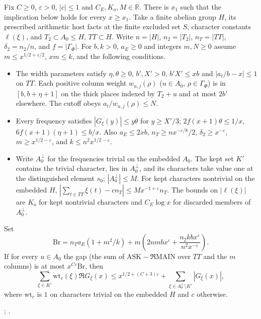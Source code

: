 
\begin{proposition}\label{sub:B09}
Fix $C\ge0$, $\varepsilon>0$, $|c|\le1$ and $C_E,K_o,M\in\mathbb R$.
There is $x_1$ such that the implication below holds for every $x\ge x_1$.
Take a finite abelian group $H$, its prescribed arithmetic host facts
at the finite excluded set $S$, character constants $\ell(\xi)$, and
$T_2\subset A_0\le H$, $TT\subset H$. Write $n=|H|$, $n_2=|T_2|$,
$n_T=|TT|$, $\delta_2=n_2/n$, and $f=|\Gamma_\Phi|$.
For $b,k>0$, $a_E\ge0$ and integers $m,N\ge0$ assume
$m\le x^{1/2+\varepsilon/2}$, $xm\le k$, and the following conditions.
\begin{itemize}
\item The width parameters satisfy $\eta,\theta\ge0$, $b',X'>0$,
$b'X'\le xb$ and $|a_t/b-x|\le1$ on $TT$.
Each positive column weight $w_{u,j}(\rho)$ ($u\in A_0$,
$\rho\in\Gamma_\Phi$) is in $[b,b+\eta+1]$ on the thick places
indexed by $T_2+u$ and at most $2b'$ elsewhere. The cutoff obeys
$a_t/w_{u,j}(\rho)\le N$.
\item Every frequency satisfies $|G_\xi(y)|\le y\theta$ for $y\ge X'/3$;
$2f(x+1)\theta\le1/x$, $6f(x+1)(\eta+1)\le b/x$.
Also $a_E\le2xb$, $n_T\ge nx^{-\varepsilon/8}/2$,
$\delta_2\ge x^{-\varepsilon}$, $m\ge x^{1/2-\varepsilon}$,
and $k\le n^2x^{1/2-\varepsilon}$.
\item Write $A_0^\perp$ for the frequencies trivial on the embedded $A_0$.
The kept set $K'$ contains the trivial character, lies in $A_0^\perp$,
and its characters take value one at the distinguished element $s_0$;
$|A_0^\perp|\le M$. For kept characters nontrivial on the embedded $H$,
$|\sum_{t\in TT}\xi(t)-cn_T|\le M x^{-1+\varepsilon}n_T$.
The bounds on $|\ell(\xi)|$ are $K_o$ for kept nontrivial characters
and $C_E\log x$ for discarded members of $A_0^\perp$.
\end{itemize}
Set
\[
 \mathrm{Br}=n_Ta_E(1+m^2/k)+
 m\left(2nmbx^\varepsilon+
          \frac{n_2kbx^\varepsilon}{n^2x^{-\varepsilon}}\right).
\]
If for every $u\in A_0$ the gap (the sum of $\mathrm{ASK}-\Re\mathrm{MAIN}$
over $TT$ and the $m$ columns) is at most $x^{C\varepsilon}\mathrm{Br}$,
then
\[
 \sum_{\xi\in K'}\mathrm{wt}_c(\xi)\Re G_\xi(x)
 \le x^{1/2+(C+3)\varepsilon}+\sum_{\xi\in A_0^\perp\setminus K'}|G_\xi(x)|,
\]
where $\mathrm{wt}_c$ is $1$ on characters trivial on the embedded $H$
and $c$ otherwise.
\end{proposition}
;
.
